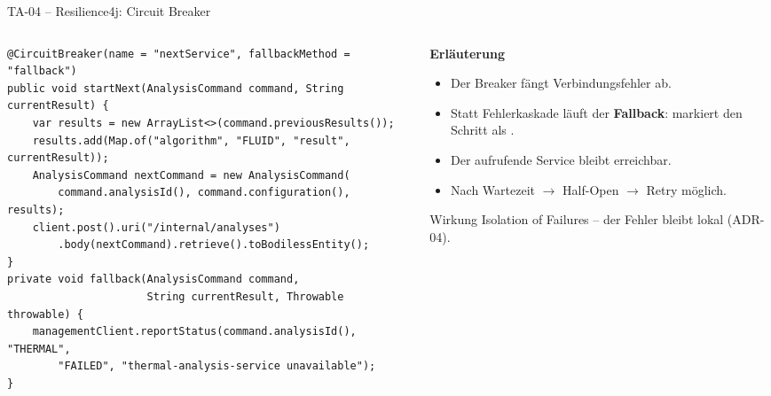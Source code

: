 \begin{frame}[fragile]{TA-04 -- Resilience4j: Circuit Breaker}
  \begin{columns}[T,onlytextwidth]
    \begin{column}{0.56\textwidth}
      \begin{lstlisting}[style=java]
@CircuitBreaker(name = "nextService", fallbackMethod = "fallback")
public void startNext(AnalysisCommand command, String currentResult) {
    var results = new ArrayList<>(command.previousResults());
    results.add(Map.of("algorithm", "FLUID", "result", currentResult));
    AnalysisCommand nextCommand = new AnalysisCommand(
        command.analysisId(), command.configuration(), results);
    client.post().uri("/internal/analyses")
        .body(nextCommand).retrieve().toBodilessEntity();
}
private void fallback(AnalysisCommand command,
                      String currentResult, Throwable throwable) {
    managementClient.reportStatus(command.analysisId(), "THERMAL",
        "FAILED", "thermal-analysis-service unavailable");
}
      \end{lstlisting}
    \end{column}
    \begin{column}{0.4\textwidth}
      \textbf{Erläuterung}
      \begin{itemize}
        \item Der Breaker fängt Verbindungsfehler ab.
        \item Statt Fehlerkaskade läuft der \textbf{Fallback}: markiert den Schritt als .
        \item Der aufrufende Service bleibt erreichbar.
        \item Nach Wartezeit $\rightarrow$ Half-Open $\rightarrow$ Retry möglich.
      \end{itemize}

      \vspace{-0.1cm}
      \begin{block}{Wirkung}
        \small Isolation of Failures -- der Fehler bleibt lokal (ADR-04).
      \end{block}
    \end{column}
  \end{columns}
\end{frame}

